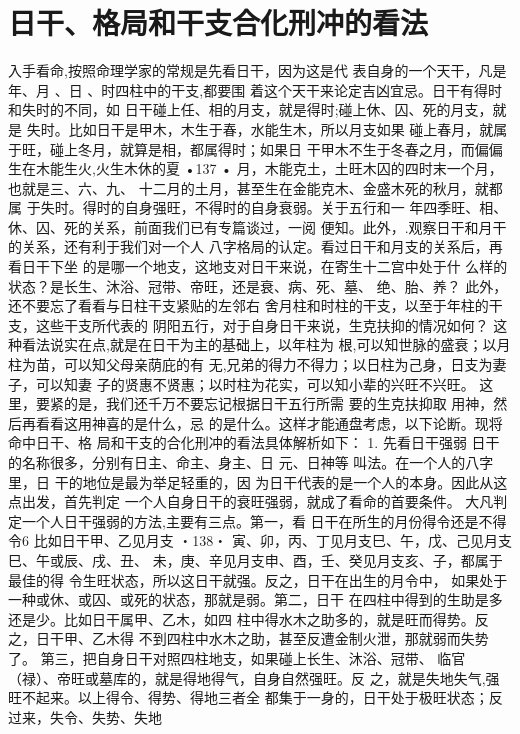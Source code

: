 \section{日干、格局和干支合化刑冲的看法}

入手看命,按照命理学家的常规是先看日干，因为这是代
表自身的一个天干，凡是年、月 、日 、时四柱中的干支,都要围
着这个天干来论定吉凶宜忌。日干有得时和失时的不同，如
日干碰上任、相的月支，就是得时;碰上休、囚、死的月支，就是
失时。比如日干是甲木，木生于春，水能生木，所以月支如果
碰上春月，就属于旺，碰上冬月，就算是相，都属得时；如果日
干甲木不生于冬春之月，而偏偏生在木能生火,火生木休的夏
•137 •
月，木能克土，土旺木囚的四时末一个月，也就是三、六、九、
十二月的土月，甚至生在金能克木、金盛木死的秋月，就都属
于失时。得时的自身强旺，不得时的自身衰弱。关于五行和一
年四季旺、相、休、囚、死的关系，前面我们已有专篇谈过，一阅
便知。此外，.观察日干和月干的关系，还有利于我们对一个人
八字格局的认定。看过日干和月支的关系后，再看日干下坐
的是哪一个地支，这地支对日干来说，在寄生十二宫中处于什
么样的状态？是长生、沐浴、冠带、帝旺，还是衰、病、死、墓、
绝、胎、养？ 此外，还不要忘了看看与日柱干支紧贴的左邻右
舍月柱和时柱的干支，以至于年柱的干支，这些干支所代表的
阴阳五行，对于自身日干来说，生克扶抑的情况如何？
这种看法说实在点,就是在日干为主的基础上，以年柱为
根,可以知世脉的盛衰；以月柱为苗，可以知父母亲荫庇的有
无,兄弟的得力不得力；以日柱为己身，日支为妻子，可以知妻
子的贤惠不贤惠；以时柱为花实，可以知小辈的兴旺不兴旺。
这里，要紧的是，我们还千万不要忘记根据日干五行所需
要的生克扶抑取 用神，然后再看看这用神喜的是什么，忌
的是什么。这样才能通盘考虑，以下论断。现将命中日干、格
局和干支的合化刑冲的看法具体解析如下：
1. 先看日干强弱
日干的名称很多，分别有日主、命主、身主、日 元、日神等
叫法。在一个人的八字里，日 干的地位是最为举足轻重的，因
为日干代表的是一个人的本身。因此从这点出发，首先判定
一个人自身日干的衰旺强弱，就成了看命的首要条件。
大凡判定一个人日干强弱的方法,主要有三点。第一，看
日干在所生的月份得令还是不得令6 比如日干甲、乙见月支
・138・
寅、卯，丙、丁见月支巳、午，戊、己见月支巳、午或辰、戌、丑、
未，庚、辛见月支申、酉，壬、癸见月支亥、子，都属于最佳的得
令生旺状态，所以这日干就强。反之，日干在出生的月令中，
如果处于一种或休、或囚、或死的状态，那就是弱。第二，日干
在四柱中得到的生助是多还是少。比如日干属甲、乙木，如四
柱中得水木之助多的，就是旺而得势。反之，日干甲、乙木得
不到四柱中水木之助，甚至反遭金制火泄，那就弱而失势了。
第三，把自身日干对照四柱地支，如果碰上长生、沐浴、冠带、
临官（禄）、帝旺或墓库的，就是得地得气，自身自然强旺。反
之，就是失地失气,强旺不起来。以上得令、得势、得地三者全
都集于一身的，日干处于极旺状态；反过来，失令、失势、失地
